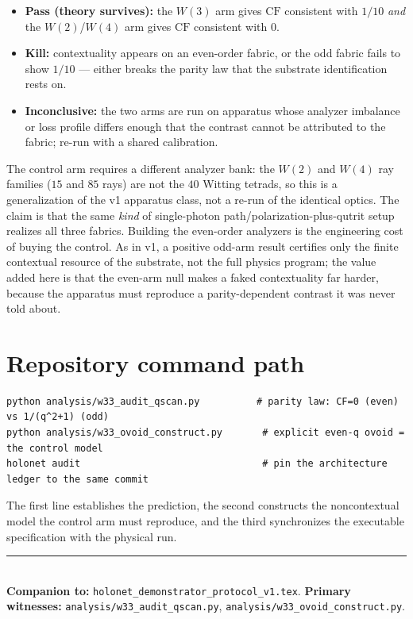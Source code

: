 \documentclass[11pt]{article}
\begin{document}
\begin{decisionbox}
\begin{itemize}[leftmargin=1.4em]
\item \textbf{Pass (theory survives):} the $W(3)$ arm gives $\mathrm{CF}$ consistent with $1/10$ \emph{and}
the $W(2)$/$W(4)$ arm gives $\mathrm{CF}$ consistent with $0$.
\item \textbf{Kill:} contextuality appears on an even-order fabric, or the odd fabric fails to show
$1/10$ --- either breaks the parity law that the substrate identification rests on.
\item \textbf{Inconclusive:} the two arms are run on apparatus whose analyzer imbalance or loss profile
differs enough that the contrast cannot be attributed to the fabric; re-run with a shared calibration.
\end{itemize}
\end{decisionbox}

\begin{honestbox}
The control arm requires a different analyzer bank: the $W(2)$ and $W(4)$ ray families ($15$ and $85$
rays) are not the $40$ Witting tetrads, so this is a generalization of the v1 apparatus class, not a
re-run of the identical optics.  The claim is that the same \emph{kind} of single-photon
path/polarization-plus-qutrit setup realizes all three fabrics.  Building the even-order analyzers is
the engineering cost of buying the control.  As in v1, a positive odd-arm result certifies only the
finite contextual resource of the substrate, not the full physics program; the value added here is that
the even-arm null makes a faked contextuality far harder, because the apparatus must reproduce a
parity-dependent contrast it was never told about.
\end{honestbox}

\section{Repository command path}
\begin{verbatim}
python analysis/w33_audit_qscan.py          # parity law: CF=0 (even) vs 1/(q^2+1) (odd)
python analysis/w33_ovoid_construct.py       # explicit even-q ovoid = the control model
holonet audit                                # pin the architecture ledger to the same commit
\end{verbatim}
The first line establishes the prediction, the second constructs the noncontextual model the control arm
must reproduce, and the third synchronizes the executable specification with the physical run.

\bigskip
\noindent\rule{\linewidth}{0.4pt}\\[0.25em]
{\footnotesize \textbf{Companion to:} \texttt{holonet\_demonstrator\_protocol\_v1.tex}.\quad
\textbf{Primary witnesses:} \texttt{analysis/w33\_audit\_qscan.py},
\texttt{analysis/w33\_ovoid\_construct.py}.}
\end{document}

